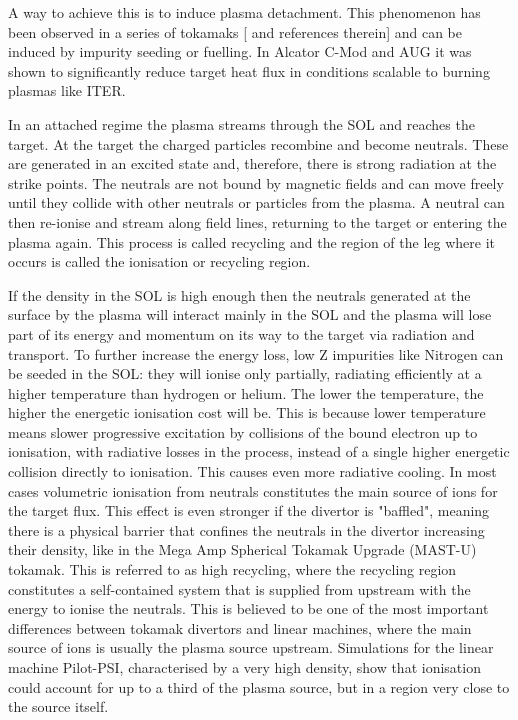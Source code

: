 A way to achieve this is to induce plasma detachment. This phenomenon has been observed in a series of tokamaks [\cite{Reimold2015} and references therein] and can be induced by impurity seeding or fuelling. In Alcator C-Mod \cite{Lipschultz2007} and AUG \cite{Kallenbach2015a} it was shown to significantly reduce target heat flux in conditions scalable to burning plasmas like ITER.

In an attached regime the plasma streams through the SOL and reaches the target. At the target the charged particles recombine and become neutrals. These are generated in an excited state and, therefore, there is strong radiation at the strike points. The neutrals are not bound by magnetic fields and can move freely until they collide with other neutrals or particles from the plasma. A neutral can then re-ionise and stream along field lines, returning to the target or entering the plasma again. This process is called recycling and the region of the leg where it occurs is called the ionisation or recycling region.

If the density in the SOL is high enough then the neutrals generated at the surface by the plasma will interact mainly in the SOL and the plasma will lose part of its energy and momentum on its way to the target via radiation and transport.\cite{Leonard2018} To further increase the energy loss, low Z impurities like Nitrogen can be seeded in the SOL: they will ionise only partially, radiating efficiently at a higher temperature than hydrogen or helium. The lower the temperature, the higher the energetic ionisation cost will be. This is because lower temperature means slower progressive excitation by collisions of the bound electron up to ionisation, with radiative losses in the process, instead of a single higher energetic collision directly to ionisation. This causes even more radiative cooling. In most cases volumetric ionisation from neutrals constitutes the main source of ions for the target flux. This effect is even stronger if the divertor is "baffled", meaning there is a physical barrier that confines the neutrals in the divertor increasing their density, like in the Mega Amp Spherical Tokamak Upgrade (MAST-U) tokamak. \cite{Krasheninnikov2016,Krasheninnikov2017a,Lipschultz1999} This is referred to as high recycling, where the recycling region constitutes a self-contained system that is supplied from upstream with the energy to ionise the neutrals. This is believed to be one of the most important differences between tokamak divertors and linear machines, where the main source of ions is usually the plasma source upstream. Simulations for the linear machine Pilot-PSI, characterised by a very high density, show that ionisation could account for up to a third of the plasma source, but in a region very close to the source itself.\cite{Jesko2018,Hayashi2016}

